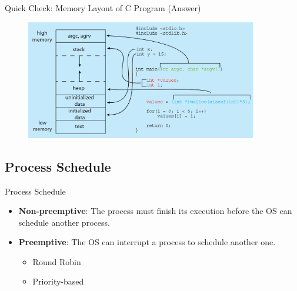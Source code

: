 \begin{frame}[fragile=singleslide,containsverbatim]{Quick Check: Memory Layout of C Program (Answer)}
	\begin{figure}[H]
		\centering
		\includegraphics[width=0.9\textwidth]{day3/img/answer-layout.png}
	\end{figure}
\end{frame}

\subsection{Process Schedule}

\begin{frame}[fragile]{Process Schedule}
	\begin{itemize}
		\item \textbf{Non-preemptive}: The process must finish its execution before the OS can schedule another process.
		\item<2-> \textbf{Preemptive}: The OS can interrupt a process to schedule another one.
		      \begin{itemize}
			      \item<3-> Round Robin
			      \item<3-> Priority-based
		      \end{itemize}
	\end{itemize}
\end{frame}

